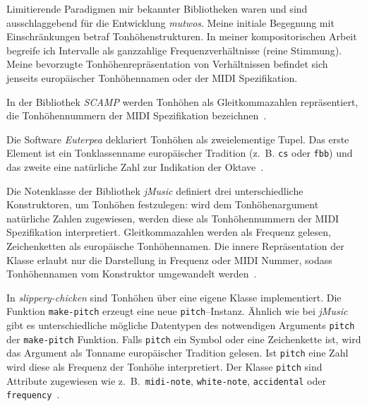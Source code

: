 \documentclass[12pt,a4paper,ngerman]{article}
\begin{document}
\bigskip

\noindent
Limitierende Paradigmen mir bekannter Bibliotheken waren und sind ausschlaggebend für die Entwicklung \emph{mutwos}.
Meine initiale Begegnung mit Einschränkungen betraf Tonhöhenstrukturen.
In meiner kompositorischen Arbeit begreife ich Intervalle als ganzzahlige Frequenzverhältnisse (reine Stimmung).
Meine bevorzugte Tonhöhenrepräsentation von Verhältnissen befindet sich jenseits europäischer Tonhöhennamen oder der MIDI Spezifikation.

\bigskip

\noindent
In der Bibliothek \emph{SCAMP} werden Tonhöhen als Gleitkommazahlen repräsentiert, die Tonhöhennummern der MIDI Spezifikation bezeichnen~\parencite{scampNoteLikeDefinition}.

\smallskip

Die Software \emph{Euterpea} deklariert Tonhöhen als zweielementige Tupel.
Das erste Element ist ein Tonklassenname europäischer Tradition (z.~B. \texttt{cs} oder \texttt{fbb}) und das zweite eine natürliche Zahl zur Indikation der Oktave~\parencite{euterpeaPitchDefinition}.

\smallskip

Die Notenklasse der Bibliothek \emph{jMusic} definiert drei unterschiedliche Konstruktoren, um Tonhöhen festzulegen:
wird dem Tonhöhenargument natürliche Zahlen zugewiesen, werden diese als Tonhöhennummern der MIDI Spezifikation interpretiert.
Gleitkommazahlen werden als Frequenz gelesen, Zeichenketten als europäische Tonhöhennamen.
Die innere Repräsentation der Klasse erlaubt nur die Darstellung in Frequenz oder MIDI Nummer, sodass Tonhöhennamen vom Konstruktor umgewandelt werden~\parencite{jMusicSource}.

\smallskip

In \emph{slippery-chicken} sind Tonhöhen über eine eigene Klasse implementiert.
Die Funktion \texttt{make-pitch} erzeugt eine neue \texttt{pitch}--Instanz.
Ähnlich wie bei \emph{jMusic} gibt es unterschiedliche mögliche Datentypen des notwendigen Arguments \texttt{pitch} der \texttt{make-pitch} Funktion.
Falls \texttt{pitch} ein Symbol oder eine Zeichenkette ist, wird das Argument als Tonname europäischer Tradition gelesen.
Ist \texttt{pitch} eine Zahl wird diese als Frequenz der Tonhöhe interpretiert.
Der Klasse \texttt{pitch} sind Attribute zugewiesen wie z.~B.\ \texttt{midi-note}, \texttt{white-note}, \texttt{accidental} oder \texttt{frequency}~\parencite{slipperyChickenSource}.
\end{document}
